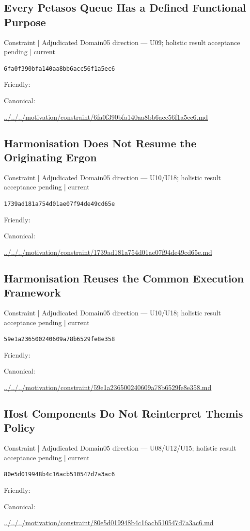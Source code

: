 \documentclass[10pt,a4paper]{article}
\begin{document}
\subsection*{Every Petasos Queue Has a Defined Functional Purpose}
{\small Constraint | Adjudicated Domain05 direction — U09; holistic result acceptance pending | current}\par
\texttt{6fa0f390bfa140aa8bb6acc56f1a5ec6}\par
Friendly: \par
Canonical: \par
{\footnotesize\url{../../../motivation/constraint/6fa0f390bfa140aa8bb6acc56f1a5ec6.md}}\par
\subsection*{Harmonisation Does Not Resume the Originating Ergon}
{\small Constraint | Adjudicated Domain05 direction — U10/U18; holistic result acceptance pending | current}\par
\texttt{1739ad181a754d01ae07f94de49cd65e}\par
Friendly: \par
Canonical: \par
{\footnotesize\url{../../../motivation/constraint/1739ad181a754d01ae07f94de49cd65e.md}}\par
\subsection*{Harmonisation Reuses the Common Execution Framework}
{\small Constraint | Adjudicated Domain05 direction — U10/U18; holistic result acceptance pending | current}\par
\texttt{59e1a236500240609a78b6529fe8e358}\par
Friendly: \par
Canonical: \par
{\footnotesize\url{../../../motivation/constraint/59e1a236500240609a78b6529fe8e358.md}}\par
\subsection*{Host Components Do Not Reinterpret Themis Policy}
{\small Constraint | Adjudicated Domain05 direction — U08/U12/U15; holistic result acceptance pending | current}\par
\texttt{80e5d019948b4c16acb510547d7a3ac6}\par
Friendly: \par
Canonical: \par
{\footnotesize\url{../../../motivation/constraint/80e5d019948b4c16acb510547d7a3ac6.md}}\par
\end{document}
